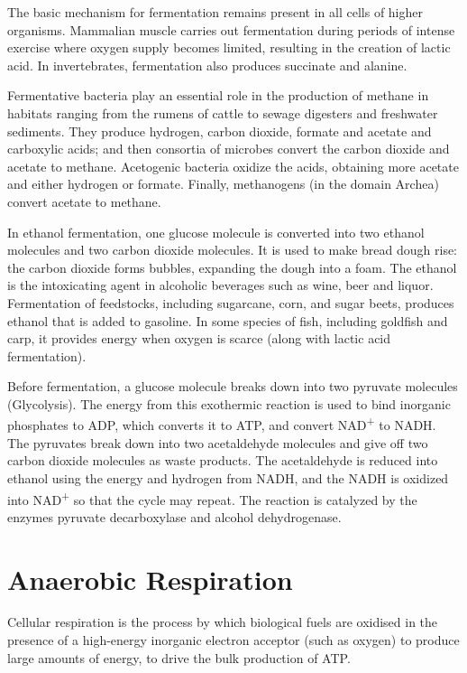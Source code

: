 The basic mechanism for fermentation remains present in all cells of higher organisms. Mammalian muscle carries out fermentation during periods of intense exercise where oxygen supply becomes limited, resulting in the creation of lactic acid. In invertebrates, fermentation also produces succinate and alanine.

Fermentative bacteria play an essential role in the production of methane in habitats ranging from the rumens of cattle to sewage digesters and freshwater sediments. They produce hydrogen, carbon dioxide, formate and acetate and carboxylic acids; and then consortia of microbes convert the carbon dioxide and acetate to methane. Acetogenic bacteria oxidize the acids, obtaining more acetate and either hydrogen or formate. Finally, methanogens (in the domain Archea) convert acetate to methane.

In ethanol fermentation, one glucose molecule is converted into two ethanol molecules and two carbon dioxide molecules. It is used to make bread dough rise: the carbon dioxide forms bubbles, expanding the dough into a foam. The ethanol is the intoxicating agent in alcoholic beverages such as wine, beer and liquor. Fermentation of feedstocks, including sugarcane, corn, and sugar beets, produces ethanol that is added to gasoline. In some species of fish, including goldfish and carp, it provides energy when oxygen is scarce (along with lactic acid fermentation).

Before fermentation, a glucose molecule breaks down into two pyruvate molecules (Glycolysis). The energy from this exothermic reaction is used to bind inorganic phosphates to ADP, which converts it to ATP, and convert NAD\textsuperscript{+} to NADH. The pyruvates break down into two acetaldehyde molecules and give off two carbon dioxide molecules as waste products. The acetaldehyde is reduced into ethanol using the energy and hydrogen from NADH, and the NADH is oxidized into NAD\textsuperscript{+} so that the cycle may repeat. The reaction is catalyzed by the enzymes pyruvate decarboxylase and alcohol dehydrogenase.

\hypertarget{anaerobic-respiration}{%
\section{Anaerobic Respiration}\label{anaerobic-respiration}}

Cellular respiration is the process by which biological fuels are oxidised in the presence of a high-energy inorganic electron acceptor (such as oxygen) to produce large amounts of energy, to drive the bulk production of ATP.

